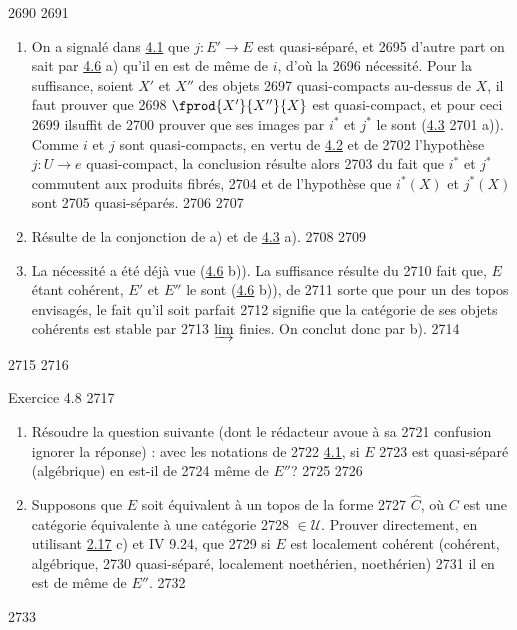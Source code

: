   2690	
  2691	\begin{enumerate}
  2692	\renewcommand{\theenumi}{\alph{enumi}}
  2693	\renewcommand{\labelenumi}{\theenumi)}
  2694	\item On a signalé dans \hyperref[VI.subsec4.1]{4.1} que $j : E'\to E$ est quasi-séparé, et
  2695	  d'autre part on sait par \hyperref[VI.prop4.6]{4.6} a) qu'il en est de même de $i$, d'où la
  2696	  nécessité. Pour la suffisance, soient $X'$ et $X''$ des objets
  2697	  quasi-compacts au-dessus de $X$, il faut prouver que
  2698	  $\fprod{X'}{X''}{X}$ est quasi-compact, et pour ceci
  2699	  il\pageoriginale suffit de
  2700	  prouver que ses images par $i^{\ast}$ et $j^{\ast}$ le sont (\hyperref[VI.cor4.3]{4.3}
  2701	  a)). Comme $i$ et $j$ sont quasi-compacts, en vertu de \hyperref[VI.prop4.2]{4.2} et de
  2702	  l'hypothèse $j : U \to e$ quasi-compact, la conclusion résulte alors
  2703	  du fait que $i^{\ast}$ et $j^{\ast}$ commutent aux produits fibrés,
  2704	  et de l'hypothèse que $i^{\ast}(X)$ et $j^{\ast}(X)$ sont
  2705	  quasi-séparés.
  2706	
  2707	\item Résulte de la conjonction de a) et de \hyperref[VI.cor4.3]{4.3} a).
  2708	
  2709	\item La nécessité a été déjà vue (\hyperref[VI.prop4.6]{4.6} b)). La suffisance résulte du
  2710	  fait que, $E$ étant cohérent, $E'$ et $E''$ le sont (\hyperref[VI.prop4.6]{4.6} b)), de
  2711	  sorte que pour un des topos envisagés, le fait qu'il soit parfait
  2712	  signifie que la catégorie de ses objets cohérents est stable par
  2713	  $\varinjlim$ finies. On conclut donc par b).
  2714	\end{enumerate}
  2715	
  2716	\begin{enonce*}[remark]{Exercice 4.8}
  2717	\begin{enumerate}
  2718	\renewcommand{\theenumi}{\alph{enumi}}
  2719	\renewcommand{\labelenumi}{\theenumi)}
  2720	\item Résoudre la question suivante (dont le rédacteur avoue à sa
  2721	  confusion ignorer la réponse) : avec les notations de
  2722	  \hyperref[VI.subsec4.1]{4.1}, si $E$
  2723	  est quasi-séparé \\ (\resp algébrique) en est-il de
  2724	  même de $E''$?
  2725	
  2726	\item Supposons que $E$ soit équivalent à un topos de la forme
  2727	  $\widehat{C}$, où $C$ est une catégorie équivalente à une catégorie
  2728	  $\in 𝒰$. Prouver directement, en utilisant \hyperref[VI.exer2.17]{2.17} c) et IV 9.24, que
  2729	  si $E$ est localement cohérent (\resp cohérent, \resp algébrique,
  2730	  \resp quasi-séparé, \resp localement noethérien, \resp noethérien)
  2731	  il en est de même de $E''$.
  2732	\end{enumerate}
  2733	\end{enonce*}
